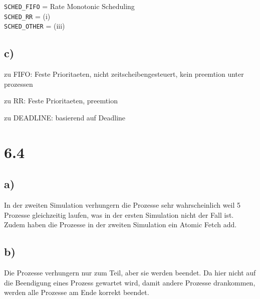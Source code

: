 \documentclass[a4paper,12pt]{article}
\begin{document}
\texttt{SCHED\_FIFO} = Rate Monotonic Scheduling \\

\texttt{SCHED\_RR} = (i) \\

\texttt{SCHED\_OTHER} = (iii) \\


\subsection*{c)}

zu FIFO:
  Feste Prioritaeten, nicht zeitscheibengesteuert, kein preemtion unter prozessen


zu RR:
  Feste Prioritaeten, preemtion
  
zu DEADLINE:
  basierend auf Deadline


\section*{6.4}

\subsection*{a)}

In der zweiten Simulation verhungern die Prozesse sehr wahrscheinlich weil 5 Prozesse gleichzeitig
laufen, was in der ersten Simulation nicht der Fall ist. Zudem haben die Prozesse in der zweiten Simulation 
ein Atomic Fetch add. 

\subsection*{b)}

Die Prozesse verhungern nur zum Teil, aber sie werden beendet. Da hier nicht auf die Beendigung eines Prozess gewartet wird, damit
andere Prozesse drankommen, werden alle Prozesse am Ende korrekt beendet.
\end{document}

